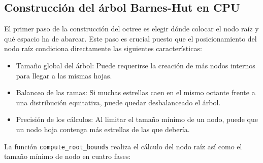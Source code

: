\subsection{Construcción del árbol Barnes-Hut en CPU}\label{subsec:version-cpu}
El primer paso de la construcción del octree es elegir dónde colocar el nodo raíz y qué espacio ha de abarcar.
Este paso es crucial puesto que el posicionamiento del nodo raíz condiciona directamente las siguientes características:
\begin{itemize}
    \item Tamaño global del árbol: Puede requerirse la creación de más nodos internos para llegar a las mismas hojas.
    \item Balanceo de las ramas: Si muchas estrellas caen en el mismo octante frente a una distribución equitativa, puede quedar desbalanceado el árbol.
    \item Precisión de los cálculos: Al limitar el tamaño mínimo de un nodo, puede que un nodo hoja contenga más estrellas de las que debería.
\end{itemize}
La función \texttt{compute\_root\_bounds} realiza el cálculo del nodo raíz así como el tamaño mínimo de nodo en cuatro fases:
